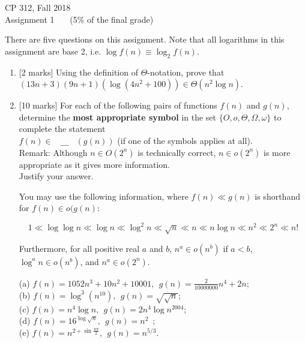 \documentclass[12pt]{article}
\begin{document}
{\Large \bf
\begin{center}

CP 312, Fall 2018 \\

Assignment 1 \ \ \ (5\% of the final grade)\\

\end{center}
} \vspace{0.2cm}
There are five questions on this assignment. Note
that all logarithms in this assignment are base 2, i.e. $\log f(n)
\equiv \log_2 f(n)$.

\vspace{0.2cm}

\begin{enumerate}

\item{[2 marks]} Using the definition of $\Theta$-notation,
prove that $(13n+3) (9n + 1) (\log (4n^2+100))  \in \Theta(n^2 \log n)$.

\vspace{0.5cm}

\item{[10 marks]} For each of the following pairs of functions $f(n)$
and $g(n)$, determine the {\bf most appropriate symbol} in the set $\{ O,
o, \Theta, \Omega, \omega \}$ to complete the statement \\
$f(n) \in $
\verb| __ | $\left( g(n) \right)$ (if one of the symbols applies at all).\\
Remark: Although $n \in O(2^n)$ is technically correct, $n \in o(2^n)$ is
more appropriate as it gives more information. \\
Justify your answer.

You may use the following information, where $f(n) \ll g(n)$ is
shorthand for $f(n) \in o(g(n)$:

$$1 \ll \log \log n \ll \log n \ll \log^2 n \ll \sqrt{n} \ll n \ll n \log n \ll n^2 \ll 2^n \ll n!$$

Furthermore, for all positive real $a$ and $b$, $n^a \in o(n^b)$ if $ a < b$, $\log^a n \in
o(n^b)$, and $n^a \in o(2^n)$.

\vspace{0.5cm}

(a) $f(n) = 1052n^3+10n^2+10001, \ \ g(n) = \frac{2}{10000000} n^4+2n$;\\
(b) $f(n) = \log^3(n^{10}), \ \ g(n) = \sqrt{\sqrt{n}}$;\\
(c) $f(n) = n^4\log n, \ \ g(n) = 2 n^4 {\log n^{2004}}$;\\
(d) $f(n) = 16^{\log \sqrt{n}}, \ \ g(n) = n^{2}$\ ; \\
(e) $f(n) = n^{2+\sin \frac{n \pi}{2}}, \ \ g(n) = n^{5/3}$.
\vspace{0.5cm}


\end{enumerate}
\end{document}
